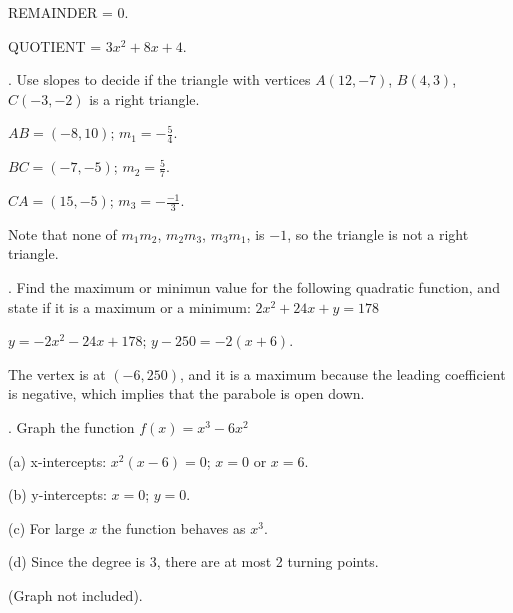\documentclass{article}
\begin{document}
REMAINDER = 0.

QUOTIENT = $3x^2 +8x + 4$.

\medskip

. Use slopes to decide if the triangle with vertices 
$\displaystyle A(12,-7)$, $\displaystyle B(4,3)$, 
$\displaystyle C(-3,-2)$ is a right triangle.

$\displaystyle AB = (-8,10)$; $m_1 = -\frac 5 4$.

$\displaystyle BC = (-7,-5)$; $m_2 = \frac 5 7$.

$\displaystyle CA = (15,-5)$; $m_3 = -\frac {-1} 3$.

Note that none of $m_1 m_2$, $m_2 m_3$, $m_3 m_1$, is $-1$, 
so the triangle is not a right triangle.

\medskip

. Find the maximum or minimun value for the following 
quadratic function, and state if it is a maximum or a minimum: 
$\displaystyle 2 x^2 +24 x + y = 178$

\noindent $\displaystyle y = -2x^2 - 24x + 178$; 
$\displaystyle y - 250 = -2(x+6)$. 

\noindent The vertex is at $(-6,250)$, and it is a maximum because 
the leading coefficient is negative, which implies that 
the parabole is open down.

\medskip

. Graph the function $\displaystyle f(x) = x^3 - 6 x^2$

(a) x-intercepts: $x^2(x-6)=0$; $x=0$ or $x=6$.

(b) y-intercepts: $x=0$; $y=0$.

(c) For large $x$ the function behaves as $x^3$.

(d) Since the degree is 3, there are at most 2 turning points.

(Graph not included).
\end{document}
